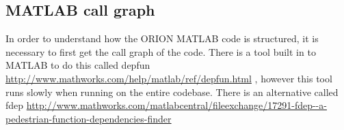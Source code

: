 
\begin{appendices}

\chapter{ MATLAB call graph}\label{appx:matlab-call-graph}

In order to understand how the ORION MATLAB code is structured, it
is necessary to first get the call graph of the code. There is a
tool built in to MATLAB to do this called
depfun
\url{http://www.mathworks.com/help/matlab/ref/depfun.html} %
, however this tool runs slowly when running on the entire codebase.
There is an alternative called fdep
\url{http://www.mathworks.com/matlabcentral/fileexchange/17291-fdep--a-pedestrian-function-dependencies-finder}


\resizebox{1.0\textwidth}{!}{}

\resizebox{1.0\textwidth}{!}{}

\resizebox{1.0\textwidth}{!}{}

\end{appendices}
